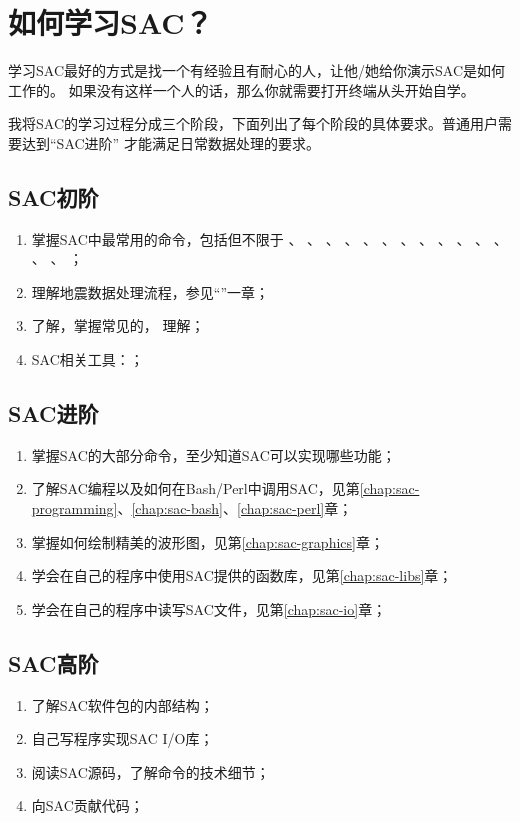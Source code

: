 \section{如何学习SAC？}
学习SAC最好的方式是找一个有经验且有耐心的人，让他/她给你演示SAC是如何工作的。
如果没有这样一个人的话，那么你就需要打开终端从头开始自学。

我将SAC的学习过程分成三个阶段，下面列出了每个阶段的具体要求。普通用户需要达到``SAC进阶''
才能满足日常数据处理的要求。

\subsection*{SAC初阶}
\begin{enumerate}
    \item 掌握SAC中最常用的命令，包括但不限于
            、
            、
            、
            、
            、
            、
            、
            、
            、
            、
            、
            、
            、
            、
            ；
        \item 理解地震数据处理流程，参见``''一章；
        \item 了解，掌握常见的，
            理解；
        \item SAC相关工具：；
\end{enumerate}

\subsection*{SAC进阶}
\begin{enumerate}
\item 掌握SAC的大部分命令，至少知道SAC可以实现哪些功能；
\item 了解SAC编程以及如何在Bash/Perl中调用SAC，见第\ref{chap:sac-programming}、\ref{chap:sac-bash}、\ref{chap:sac-perl}章；
\item 掌握如何绘制精美的波形图，见第\ref{chap:sac-graphics}章；
\item 学会在自己的程序中使用SAC提供的函数库，见第\ref{chap:sac-libs}章；
\item 学会在自己的程序中读写SAC文件，见第\ref{chap:sac-io}章；
\end{enumerate}

\subsection*{SAC高阶}
\begin{enumerate}
\item 了解SAC软件包的内部结构；
\item 自己写程序实现SAC I/O库；
\item 阅读SAC源码，了解命令的技术细节；
\item 向SAC贡献代码；
\end{enumerate}
